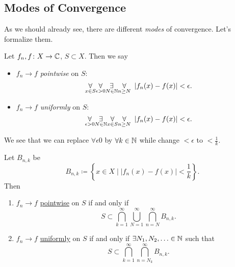 \subsection{Modes of Convergence}
As we should already see, there are different \emph{modes} of convergence. Let's formalize them.
\begin{definition}\label{def:pointwise-convergence}\label{def:uniformly-convergence}
	Let \(f_{n}, f\colon X\to \mathbb{\MakeUppercase{c}} \), \(S\subset X\). Then we say
	\begin{itemize}
		\item \(f_{n}\to f\) \emph{pointwise} on \(S\):
		      \[
			      \underset{x\in S}{\forall}\underset{\epsilon>0}{\forall} \underset{ N\in \mathbb{\MakeUppercase{N}}}{\exists}\underset{n\geq  N}{\forall}\ \left\vert f_{n}(x) - f(x) \right\vert < \epsilon.
		      \]
		\item \(f_{n}\to f\) \emph{uniformly} on \(S\):
		      \[
			      \underset{\epsilon >0}{\forall}\underset{N\in\mathbb{\MakeUppercase{n}}}{\exists}\underset{x\in S}{\forall}\underset{n\geq N}{\forall}\ \left\vert f_{n}(x) - f(x) \right\vert < \epsilon.
		      \]
	\end{itemize}
\end{definition}

\begin{remark}
	We see that we can replace \(\forall \epsilon 0\) by \(\forall k\in \mathbb{\MakeUppercase{n}} \) while change \(< \epsilon \) to \(< \frac{1}{k}\).
\end{remark}
\begin{lemma}
	Let \(B_{n, k}\) be
	\[
		B_{n, k}\coloneqq \left\{x\in X \mid \left\vert f_{n}(x) - f(x) \right\vert < \frac{1}{k}\right\}.
	\]
	Then
	\begin{enumerate}
		\item \(f_{n}\to f\) \hyperref[def:pointwise-convergence]{pointwise} on \(S\) if and only if
		      \[
			      S\subset \bigcap\limits_{k=1}^{\infty} \bigcup\limits_{N=1}^{\infty} \bigcap\limits_{n=N}^{\infty} B_{n, k}.
		      \]
		\item \(f_{n}\to f\) \hyperref[def:uniformly-convergence]{uniformly} on \(S\) if and only if \(\exists N_1, N_2, \ldots \in \mathbb{\MakeUppercase{n}}\) such that
		      \[
			      S\subset \bigcap\limits_{k=1}^{\infty} \bigcap\limits_{n=N_{k}}^{\infty} B_{n, k}.
		      \]
	\end{enumerate}
\end{lemma}

